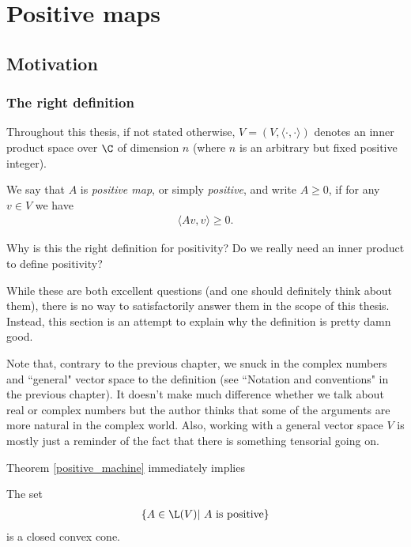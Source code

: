 \chapter{Positive maps}

\section{Motivation}

\subsection{The right definition}

Throughout this thesis, if not stated otherwise, $V = (V, \langle \cdot, \cdot \rangle)$ denotes an inner product space over $\C$ of dimension $n$ (where $n$ is an arbitrary but fixed positive integer).

\begin{maar}
	We say that $A$ is \textit{positive map}, or simply \textit{positive}, and write $A \geq 0$, if for any $v \in V$ we have
	\begin{align*}
		\langle A v, v \rangle \geq 0.
	\end{align*}
\end{maar}

Why is this the right definition for positivity? Do we really need an inner product to define positivity?

While these are both excellent questions (and one should definitely think about them), there is no way to satisfactorily answer them in the scope of this thesis. Instead, this section is an attempt to explain why the definition is pretty damn good.

Note that, contrary to the previous chapter, we snuck in the complex numbers and ``general" vector space to the definition (see ``Notation and conventions" in the previous chapter). It doesn't make much difference whether we talk about real or complex numbers but the author thinks that some of the arguments are more natural in the complex world. Also, working with a general vector space $V$ is mostly just a reminder of the fact that there is something tensorial going on.

Theorem \ref{positive_machine} immediately implies

\begin{lause}
The set
\begin{align*}
	\{A \in \L(V) | \text{ $A$ is positive} \}
\end{align*}
is a closed convex cone.
\end{lause}

